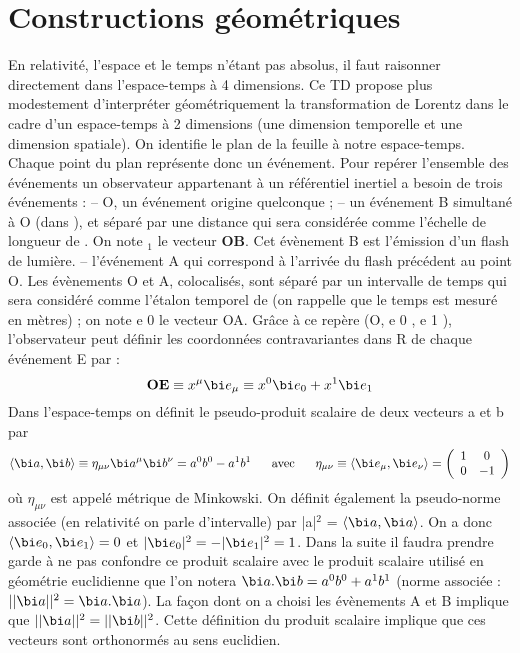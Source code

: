 
\chapter{Constructions géométriques}%
En relativité, l’espace et le temps n’étant pas absolus, il faut raisonner directement dans
l’espace-temps à 4 dimensions. Ce TD propose plus modestement d’interpréter géométriquement
la transformation de Lorentz dans le cadre d’un espace-temps à 2 dimensions (une dimension
temporelle et une dimension spatiale).
On identifie le plan de la feuille à notre espace-temps. Chaque point du plan représente donc
un événement. Pour repérer l’ensemble des événements un observateur  appartenant à un
référentiel inertiel  a besoin de trois événements :
– O, un événement origine quelconque ;
– un événement B simultané à O (dans ), et séparé par une distance qui sera considérée
comme l’échelle de longueur de . On note $_1$ le vecteur {\bf OB}. Cet évènement B est l’émission
d’un flash de lumière.
– l’événement A qui correspond à l’arrivée du flash précédent au point O. Les évènements O
et A, colocalisés, sont séparé par un intervalle de temps qui sera considéré comme l’étalon
temporel de  (on rappelle que le temps est mesuré en mètres) ; on note e 0 le vecteur OA.
Grâce à ce repère (O, e 0 , e 1 ), l’observateur peut définir les coordonnées contravariantes dans R
de chaque événement E par :
\[
{\bf OE} \equiv x^\mu {\bi e}_\mu \equiv x^0 {\bi e}_0 + x^1 {\bi e}_1
\]
Dans l’espace-temps on définit le pseudo-produit scalaire de deux vecteurs a et b par
\[
\langle {\bi a}, {\bi b} \rangle \equiv 
\eta_{\mu \nu}{\bi a}^ \mu {\bi b}^ \nu = a^0b^0-a^1b^1
\text{ \ \ \ \ avec \ \ \ \ }
\eta_{\mu \nu} \equiv \langle {\bi e}_\mu, {\bi e}_\nu \rangle =
\left( \begin{array}{ c c }
 1 & 0 \\ 0 & -1
\end{array} \right)
\]
où $\eta_{\mu \nu}$ est appelé métrique de Minkowski. On définit également la pseudo-norme associée (en
relativité on parle d’intervalle) par |{\bi a}|$^2$ = $\langle {\bi a}, {\bi a} \rangle$. On a donc $\langle {\bi e}_0, {\bi e}_1 \rangle = 0$ et $|{\bi e}_0|^2=-|{\bi e}_1|^2=1$.
Dans la suite il faudra prendre garde à ne pas confondre ce produit scalaire avec le produit
scalaire utilisé en géométrie euclidienne que l’on notera ${\bi a}.{\bi b} = a^0 b^0 + a^1 b^1$ (norme associée :
$||{\bi a}||^2 = {\bi a}.{\bi a}$). La façon dont on a choisi les évènements A et B implique que $||{\bi a}||^2 = ||{\bi b}||^2$. Cette
définition du produit scalaire implique que ces vecteurs sont orthonormés au sens euclidien.
